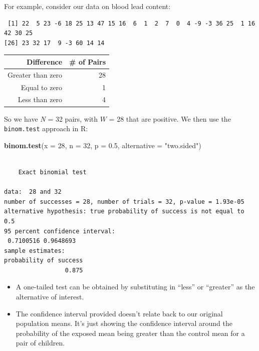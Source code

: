 \documentclass[
]{book}
\newenvironment{Shaded}{\begin{snugshade}}{\end{snugshade}}
\newcommand{\DataTypeTok}[1]{\textcolor[rgb]{0.13,0.29,0.53}{#1}}
\newcommand{\DecValTok}[1]{\textcolor[rgb]{0.00,0.00,0.81}{#1}}
\newcommand{\FloatTok}[1]{\textcolor[rgb]{0.00,0.00,0.81}{#1}}
\newcommand{\KeywordTok}[1]{\textcolor[rgb]{0.13,0.29,0.53}{\textbf{#1}}}
\newcommand{\NormalTok}[1]{#1}
\newcommand{\OperatorTok}[1]{\textcolor[rgb]{0.81,0.36,0.00}{\textbf{#1}}}
\newcommand{\StringTok}[1]{\textcolor[rgb]{0.31,0.60,0.02}{#1}}
\providecommand{\tightlist}{%
  \setlength{\itemsep}{0pt}\setlength{\parskip}{0pt}}
\begin{document}
For example, consider our data on blood lead content:

\begin{Shaded}
\end{Shaded}

\begin{verbatim}
 [1] 22  5 23 -6 18 25 13 47 15 16  6  1  2  7  0  4 -9 -3 36 25  1 16 42 30 25
[26] 23 32 17  9 -3 60 14 14
\end{verbatim}

\begin{longtable}[]{@{}rr@{}}
\toprule
Difference & \# of Pairs\tabularnewline
\midrule
\endhead
Greater than zero & 28\tabularnewline
Equal to zero & 1\tabularnewline
Less than zero & 4\tabularnewline
\bottomrule
\end{longtable}

So we have \emph{N} = 32 pairs, with \(W\) = 28 that are positive. We then use the \texttt{binom.test} approach in R:

\begin{Shaded}
\begin{Highlighting}[]
\KeywordTok{binom.test}\NormalTok{(}\DataTypeTok{x =} \DecValTok{28}\NormalTok{, }\DataTypeTok{n =} \DecValTok{32}\NormalTok{, }\DataTypeTok{p =} \FloatTok{0.5}\NormalTok{, }
           \DataTypeTok{alternative =} \StringTok{"two.sided"}\NormalTok{)}
\end{Highlighting}
\end{Shaded}

\begin{verbatim}

	Exact binomial test

data:  28 and 32
number of successes = 28, number of trials = 32, p-value = 1.93e-05
alternative hypothesis: true probability of success is not equal to 0.5
95 percent confidence interval:
 0.7100516 0.9648693
sample estimates:
probability of success 
                 0.875 
\end{verbatim}

\begin{itemize}
\tightlist
\item
  A one-tailed test can be obtained by substituting in ``less'' or ``greater'' as the alternative of interest.
\item
  The confidence interval provided doesn't relate back to our original population means. It's just showing the confidence interval around the probability of the exposed mean being greater than the control mean for a pair of children.
\end{itemize}
\end{document}
